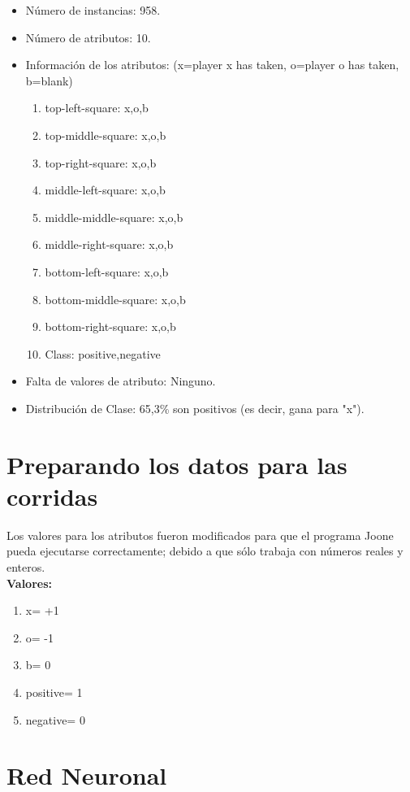 \documentclass[12pt,titlepage]{article}
\begin{document}
\begin{itemize}
 \item N\'umero de instancias: 958.
 \item N\'umero de atributos: 10.
 \item Informaci\'on de los atributos: (x=player x has taken, o=player o has taken, b=blank)
    \begin{enumerate}
      \item top-left-square: {x,o,b}
      \item top-middle-square: {x,o,b}
      \item top-right-square: {x,o,b}
      \item middle-left-square: {x,o,b}
      \item middle-middle-square: {x,o,b}
      \item middle-right-square: {x,o,b}
      \item bottom-left-square: {x,o,b}
      \item bottom-middle-square: {x,o,b}
      \item bottom-right-square: {x,o,b}
      \item Class: {positive,negative}
    \end{enumerate}
 \item Falta de valores de atributo: Ninguno.
 \item Distribución de Clase: 65,3\% son positivos (es decir, gana para "x").
\end{itemize}

\section{Preparando los datos para las corridas}
Los valores para los atributos fueron modificados para que el programa Joone pueda ejecutarse correctamente;
debido a que s\'olo trabaja con n\'umeros reales y enteros. \\
{\bf{Valores:}}
    \begin{enumerate}
      \item x= +1
      \item o= -1
      \item b= 0
      \item positive= 1
      \item negative= 0
    \end{enumerate}

\section{Red Neuronal}
\end{document}
